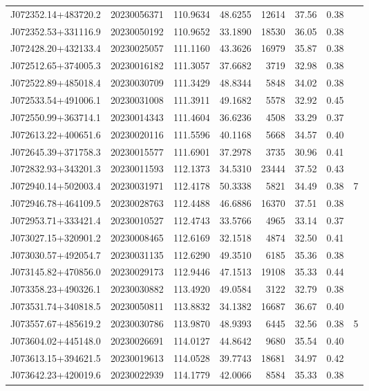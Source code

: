 \documentclass{article}
\begin{document}
\begin {longtable}{|l|l|r|r|r|r|r|l|}
 J072352.14+483720.2&  20230056371&  110.9634&   48.6255& 12614& 37.56& 0.38&\\
 J072352.53+331116.9&  20230050192&  110.9652&   33.1890& 18530& 36.05& 0.38&\\
 J072428.20+432133.4&  20230025057&  111.1160&   43.3626& 16979& 35.87& 0.38&\\
 J072512.65+374005.3&  20230016182&  111.3057&   37.6682&  3719& 32.98& 0.38&\\
 J072522.89+485018.4&  20230030709&  111.3429&   48.8344&  5848& 34.02& 0.38&\\
 J072533.54+491006.1&  20230031008&  111.3911&   49.1682&  5578& 32.92& 0.45&\\
 J072550.99+363714.1&  20230014343&  111.4604&   36.6236&  4508& 33.29& 0.37&\\
 J072613.22+400651.6&  20230020116&  111.5596&   40.1168&  5668& 34.57& 0.40&\\
 J072645.39+371758.3&  20230015577&  111.6901&   37.2978&  3735& 30.96& 0.41&\\
 J072832.93+343201.3&  20230011593&  112.1373&   34.5310& 23444& 37.52& 0.43&\\
 J072940.14+502003.4&  20230031971&  112.4178&   50.3338&  5821& 34.49& 0.38&7\\
 J072946.78+464109.5&  20230028763&  112.4488&   46.6886& 16370& 37.51& 0.38&\\
 J072953.71+333421.4&  20230010527&  112.4743&   33.5766&  4965& 33.14& 0.37&\\
 J073027.15+320901.2&  20230008465&  112.6169&   32.1518&  4874& 32.50& 0.41&\\
 J073030.57+492054.7&  20230031135&  112.6290&   49.3510&  6185& 35.36& 0.38&\\
 J073145.82+470856.0&  20230029173&  112.9446&   47.1513& 19108& 35.33& 0.44&\\
 J073358.23+490326.1&  20230030882&  113.4920&   49.0584&  3122& 32.79& 0.38&\\
 J073531.74+340818.5&  20230050811&  113.8832&   34.1382& 16687& 36.67& 0.40&\\
 J073557.67+485619.2&  20230030786&  113.9870&   48.9393&  6445& 32.56& 0.38&5\\
 J073604.02+445148.0&  20230026691&  114.0127&   44.8642&  9680& 35.54& 0.40&\\
 J073613.15+394621.5&  20230019613&  114.0528&   39.7743& 18681& 34.97& 0.42&\\
 J073642.23+420019.6&  20230022939&  114.1779&   42.0066&  8584& 35.33& 0.38&\\

\end{longtable}
\end{document}
